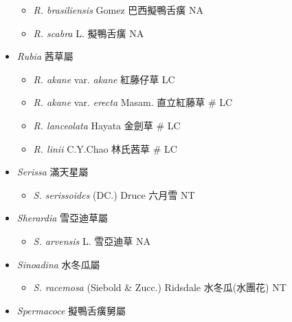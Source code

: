 \begin{itemize}
  \begin{itemize}
        \item[] \textit{R. brasiliensis} Gomez  巴西擬鴨舌癀   NA
        \item[] \textit{R. scabra} L.  擬鴨舌癀   NA
  \end{itemize}
 \item[] \textit{Rubia} 茜草屬
                                
  \begin{itemize}
        \item[] \textit{R. akane} var. \textit{akane}   紅藤仔草   LC
        \item[] \textit{R. akane} var. \textit{erecta} Masam.  直立紅藤草  \# LC
        \item[] \textit{R. lanceolata} Hayata  金劍草  \# LC
        \item[] \textit{R. linii} C.Y.Chao  林氏茜草  \# LC
  \end{itemize}
 \item[] \textit{Serissa} 滿天星屬
                                
  \begin{itemize}
        \item[] \textit{S. serissoides} (DC.) Druce  六月雪   NT
  \end{itemize}
 \item[] \textit{Sherardia} 雪亞迪草屬
                                
  \begin{itemize}
        \item[] \textit{S. arvensis} L.  雪亞迪草   NA
  \end{itemize}
 \item[] \textit{Sinoadina} 水冬瓜屬
                                
  \begin{itemize}
        \item[] \textit{S. racemosa} (Siebold \& Zucc.) Ridsdale  水冬瓜(水團花)   NT
  \end{itemize}
 \item[] \textit{Spermacoce} 擬鴨舌癀舅屬
                                

\end{itemize}
